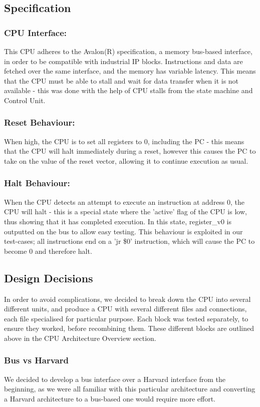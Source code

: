 \documentclass{article}
\begin{document}
\subsection{Specification}

\subsubsection{CPU Interface:} This CPU adheres to the Avalon(R) specification, a memory bus-based interface, in order to be compatible with industrial IP blocks. Instructions and data are fetched over the same interface, and the memory has variable latency. This means that the CPU must be able to stall and wait for data transfer when it is not available - this was done with the help of CPU stalls from the state machine and Control Unit.
\subsubsection{Reset Behaviour:} When high, the CPU is to set all registers to 0, including the PC - this means that the CPU will halt immediately during a reset, however this causes the PC to take on the value of the reset vector, allowing it to continue execution as usual.
\subsubsection{Halt Behaviour:} When the CPU detects an attempt to execute an instruction at address 0, the CPU will halt - this is a special state where the 'active' flag of the CPU is low, thus showing that it has completed execution. In this state, register\_v0 is outputted on the bus to allow easy testing. This behaviour is exploited in our test-cases; all instructions end on a 'jr \$0' instruction, which will cause the PC to become 0 and therefore halt.

\subsection{Design Decisions}
In order to avoid complications, we decided to break down the CPU into several different units, and produce a CPU with several different files and connections, each file specialised for particular purpose.
Each block was tested separately, to ensure they worked, before recombining them. These different blocks are outlined above in the CPU Architecture Overview section.

\subsubsection{Bus vs Harvard}
We decided to develop a bus interface over a Harvard interface from the beginning, as we were all familiar with this particular architecture and converting a Harvard architecture to a bus-based one would require more effort.
\end{document}

